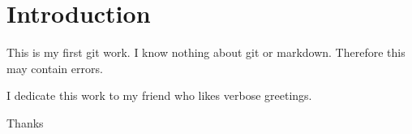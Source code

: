 \documentclass{article}
\begin{document}
\section{Introduction}

This is my first git work. I know nothing about git or markdown. Therefore this may contain errors.

I dedicate this work to my friend who likes verbose greetings.

Thanks
\end{document}
